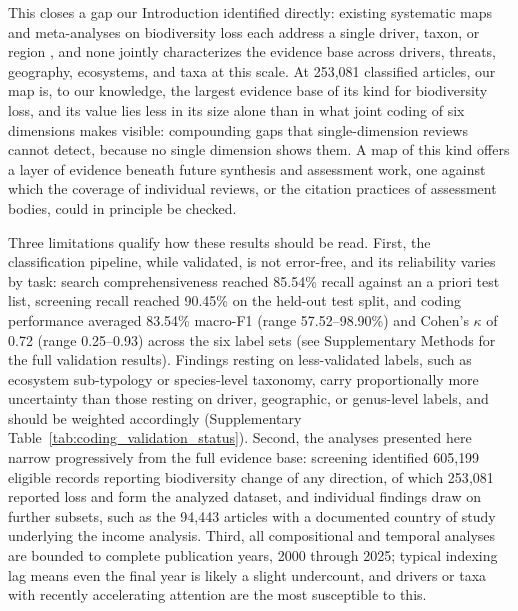\documentclass[12pt]{article}
\begin{document}
This closes a gap our Introduction identified directly: existing systematic maps and meta-analyses on biodiversity loss each address a single driver, taxon, or region \cite{feeley2017most, moullec_identifying_2021, jaureguiberry_direct_2022, duenas_threat_2021}, and none jointly characterizes the evidence base across drivers, threats, geography, ecosystems, and taxa at this scale. At 253{,}081 classified articles, our map is, to our knowledge, the largest evidence base of its kind for biodiversity loss, and its value lies less in its size alone than in what joint coding of six dimensions makes visible: compounding gaps that single-dimension reviews cannot detect, because no single dimension shows them. A map of this kind offers a layer of evidence beneath future synthesis and assessment work, one against which the coverage of individual reviews, or the citation practices of assessment bodies, could in principle be checked.

Three limitations qualify how these results should be read. First, the classification pipeline, while validated, is not error-free, and its reliability varies by task: search comprehensiveness reached 85.54\% recall against an a priori test list, screening recall reached 90.45\% on the held-out test split, and coding performance averaged 83.54\% macro-F1 (range 57.52--98.90\%) and Cohen's $\kappa$ of 0.72 (range 0.25--0.93) across the six label sets (see Supplementary Methods for the full validation results). Findings resting on less-validated labels, such as ecosystem sub-typology or species-level taxonomy, carry proportionally more uncertainty than those resting on driver, geographic, or genus-level labels, and should be weighted accordingly (Supplementary Table~\ref{tab:coding_validation_status}). Second, the analyses presented here narrow progressively from the full evidence base: screening identified 605{,}199 eligible records reporting biodiversity change of any direction, of which 253{,}081 reported loss and form the analyzed dataset, and individual findings draw on further subsets, such as the 94{,}443 articles with a documented country of study underlying the income analysis. Third, all compositional and temporal analyses are bounded to complete publication years, 2000 through 2025; typical indexing lag means even the final year is likely a slight undercount, and drivers or taxa with recently accelerating attention are the most susceptible to this.
\end{document}
